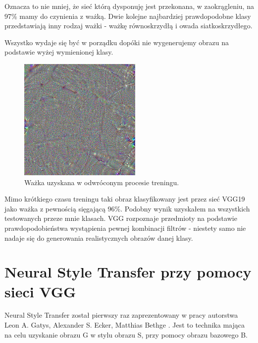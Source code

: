 Oznacza to nie mniej, że sieć którą dysponuję jest przekonana, w zaokrągleniu, na 97\% mamy do czynienia z ważką. Dwie kolejne najbardziej prawdopodobne klasy przedstawiają inny rodzaj ważki - ważkę równoskrzydłą i owada siatkoskrzydłego.

Wszystko wydaje się być w porządku dopóki nie wygenerujemy obrazu na podstawie wyżej wymienionej klasy.

\begin{figure}[ht]
\centerline{\includegraphics[scale=0.8]{resources/vgg_mean_topincluded/dragonfly-fake.png}}
\caption{Ważka uzyskana w odwróconym procesie treningu.}
\label{fig:wazka-fake}
\end{figure}

Mimo krótkiego czasu treningu taki obraz klasyfikowany jest przez sieć VGG19 jako ważka z pewnością sięgającą 96\%. Podobny wynik uzyskałem na wszystkich testowanych przeze mnie klasach. VGG rozpoznaje przedmioty na podstawie prawdopodobieństwa wystąpienia pewnej kombinacji filtrów - niestety samo nie nadaje się do generowania realistycznych obrazów danej klasy.

\section{Neural Style Transfer przy pomocy sieci VGG}
\label{vgg-nst}
Neural Style Transfer został pierwszy raz zaprezentowany w pracy autorstwa Leon A. Gatys, Alexander S. Ecker, Matthias Bethge \cite{nstpaper}. Jest to technika mająca na celu uzyskanie obrazu G w stylu obrazu S, przy pomocy obrazu bazowego B.


